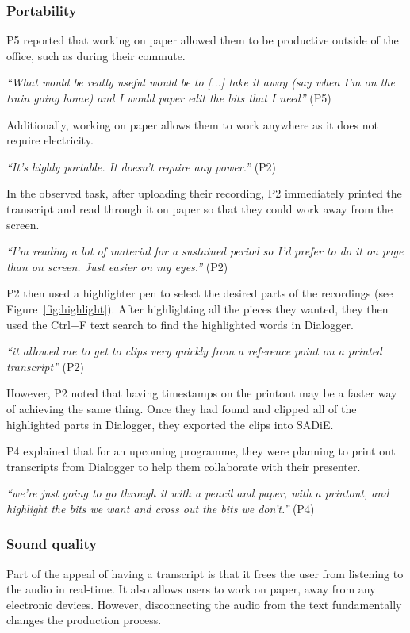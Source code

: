 \subsubsection{Portability}

P5 reported that working on paper allowed them to be productive outside of
the office, such as during their commute.

\textit{``What would be really useful would be to [...] take it away (say when
  I'm on the train going home) and I would paper edit the bits that I need''}
(P5)

Additionally, working on paper allows them to work anywhere as it does not
require electricity.

\textit{``It's highly portable. It doesn't require any power.''} (P2)

In the observed task, after uploading their recording, P2 immediately printed
the transcript and read through it on paper so that they could work away from
the screen.

\textit{``I'm reading a lot of material for a sustained period so I'd prefer to do it on page than on screen. Just
  easier on my eyes.''} (P2)


P2 then used a highlighter pen to select the desired parts of the recordings (see Figure~\ref{fig:highlight}).  After
highlighting all the pieces they wanted,
they then used the Ctrl+F text search to find the highlighted words in Dialogger.

\textit{``it allowed me to get to clips very quickly from a reference point on a printed transcript''} (P2)

However, P2 noted that having timestamps on the printout may be a faster
way of achieving the same thing.
Once they had found and clipped all of the highlighted parts in Dialogger, they exported the clips into SADiE.

P4 explained that for an upcoming programme, they were
planning to print out transcripts from Dialogger to help
them collaborate with their presenter.

\textit{``we're just going to go through it with a pencil and paper, with a
  printout, and highlight the bits we want and cross out the bits we don't.''}
(P4)

\subsubsection{Sound quality}
Part of the appeal of having a transcript is that it frees the user from listening to the audio in real-time. It also
allows users to work on paper, away from any electronic devices. However, disconnecting the audio from the text
fundamentally changes the production process.

